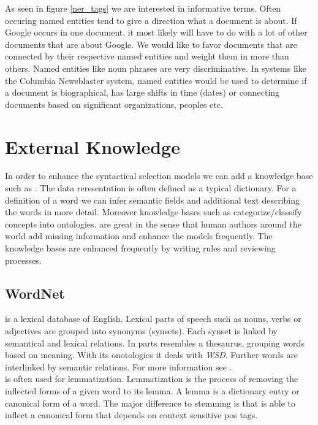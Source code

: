   As seen in figure \ref{ner_tags} we are interested in informative terms. Often occuring named entities tend to give a direction what a document is about. If Google occurs in one document, it most likely will have to do with a lot of other documents that are about Google. We would like to favor documents that are connected by their respective named entities and weight them in more than others. Named entities like noun phrases are very discriminative. In systems like the Columbia Newsblaster system, named entities would be used to determine if a document is biographical, has large shifts in time (dates) or connecting documents based on significant organizations, peoples etc. \cite{ColumbiaMultiDoc2001}

\section{External Knowledge}
\label{sec:semantic_selection}

  In order to enhance the syntactical selection models we can add a knowledge base such as \wordwiki{}. The data reresentation is often defined as a typical dictionary. For a definition of a word we can infer semantic fields and additional text describing the words in more detail. Moreover knowledge bases such as \wiki{} categorize/classify concepts into ontologies. \wordwiki{} are great in the sense that human authors around the world add missing information and enhance the models frequently. The knowledge bases are enhanced frequently by writing rules and reviewing processes.

  \subsection{WordNet}
  \label{sec:wordnet}

  \wordnet{} is a lexical database of English. Lexical parts of speech such as nouns, verbs or adjectives are grouped into synonyms (synsets). Each synset is linked by semantical and lexical relations. In parts \wordnet{} resembles a thesaurus, grouping words based on meaning. With its onotologies it deals with \emph{WSD}. Further words are interlinked by semantic relations. For more information see \cite{Wordnet1995, Wordnet1998}. \\
  \wordnet{} is often used for lemmatization. Lemmatization is the process of removing the inflected forms of a given word to its lemma. A lemma is a dictionary entry or canonical form of a word. The major difference to stemming is that \wordnet{} is able to inflect a canonical form that depends on context sensitive pos tags. 

